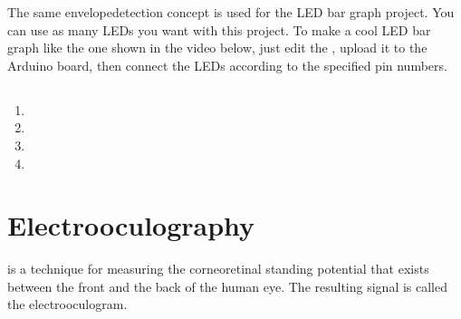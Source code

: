 \documentclass[a4paper,10pt,english,oneside]{sphinxmanual}
\begin{document}
\sphinxAtStartPar
The same envelope\sphinxhyphen{}detection concept is used for the LED bar graph project. You can use as many LEDs you want with this project. To make a cool LED bar graph like the one shown in the video below, just edit the  , upload it to the Arduino board, then connect the LEDs according to the specified pin numbers.


\subsection{}
\label{\detokenize{applications/index:id5}}\begin{enumerate}
%
\item {} 
\sphinxAtStartPar
{}

\item {} 
\sphinxAtStartPar
{}

\item {} 
\sphinxAtStartPar
{}

\item {} 
\sphinxAtStartPar
{}

\end{enumerate}

\begin{DUlineblock}{0em}
\item[] 
\end{DUlineblock}


\section{Electrooculography}
\label{\detokenize{applications/index:electrooculography}}\label{\detokenize{applications/index:open3}}
\sphinxAtStartPar
{} is a technique for measuring the corneo\sphinxhyphen{}retinal standing potential that exists between the front and the back of the human eye. The resulting signal is called the electrooculogram.
\end{document}

